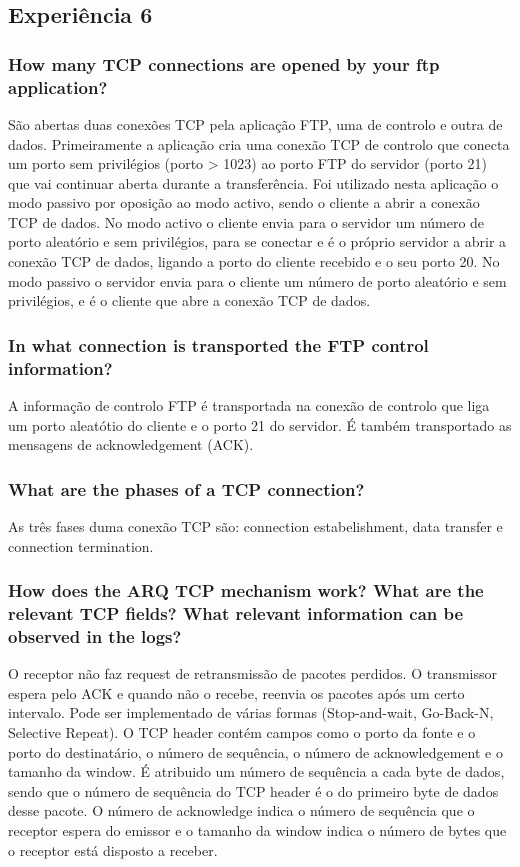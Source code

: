 \documentclass[a4paper]{article}
\begin{document}
\subsection{Experiência 6}

\subsubsection{How many TCP connections are opened by your ftp application?}

São abertas duas conexões TCP pela aplicação FTP, uma de controlo e outra de dados.
Primeiramente a aplicação cria uma conexão TCP de controlo que conecta um porto sem privilégios (porto > 1023) ao porto FTP do servidor (porto 21) que vai continuar aberta durante a transferência.
Foi utilizado nesta aplicação o modo passivo por oposição ao modo activo, sendo o cliente a abrir a conexão TCP de dados.
No modo activo o cliente envia para o servidor um número de porto aleatório e sem privilégios, para se conectar e é o próprio servidor a abrir a conexão TCP de dados, ligando a porto do cliente recebido e o seu porto 20.
No modo passivo o servidor envia para o cliente um número de porto aleatório e sem privilégios, e é o cliente que abre a conexão TCP de dados.

\subsubsection{In what connection is transported the FTP control information?}

A informação de controlo FTP é transportada na conexão de controlo que liga um porto aleatótio do cliente e o porto 21 do servidor. É também transportado as mensagens de acknowledgement (ACK).

\subsubsection{What are the phases of a TCP connection?}

As três fases duma conexão TCP são: connection estabelishment, data transfer e connection termination.

\subsubsection{How does the ARQ TCP mechanism work? What are the relevant TCP
fields? What relevant information can be observed in the logs?}

O receptor não faz request de retransmissão de pacotes perdidos. O transmissor espera pelo ACK e quando
não o recebe, reenvia os pacotes após um certo intervalo. Pode ser implementado de várias formas (Stop-and-wait, Go-Back-N,
Selective Repeat).
O TCP header contém campos como o porto da fonte e o porto do destinatário, o número de sequência, o número de acknowledgement e
o tamanho da window.
É atribuido um número de sequência a cada byte de dados, sendo que o número de sequência do TCP header é o do primeiro byte de dados desse pacote. O número de acknowledge indica o número de sequência que o receptor espera do emissor e o tamanho da window indica o número de bytes que o receptor está disposto a receber.
\end{document}
